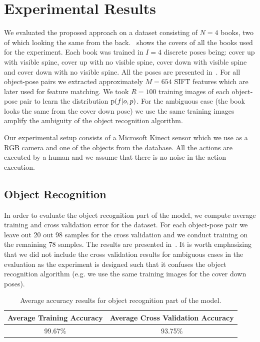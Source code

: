 \section{Experimental Results}



    We evaluated the proposed approach on a dataset consisting of $N = 4$ books, two of which looking the same from the back.~ shows the covers of all the books used for the experiment. Each book was trained in $I = 4$ discrete poses being: cover up with visible spine, cover up with no visible spine, cover down with visible spine and cover down with no visible spine. All the poses are presented in~. For all object-pose pairs we extracted approximately $M = 654$ SIFT features which are later used for feature matching. We took $R = 100$ training images of each object-pose pair to learn the distribution $\text{p}(f|o,p)$. For the ambiguous case (the book looks the same from the cover down pose) we use the same training images amplify the ambiguity of the object recognition algorithm.

    Our experimental setup consists of a Microsoft Kinect sensor which we use as a RGB camera and one of the objects from the database. All the actions are executed by a human and we assume that there is no noise in the action execution. 

    \subsection{Object Recognition}
        In order to evaluate the object recognition part of the model, we compute average training and cross validation error for the dataset. For each object-pose pair we leave out 20 out 98 samples for the cross validation and we conduct training on the remaining 78 samples. The results are presented in~. It is worth emphasizing that we did not include the cross validation results for ambiguous cases in the evaluation as the experiment is designed such that it confuses the object recognition algorithm (e.g. we use the same training images for the cover down poses).  
        
        \begin{table}[h]
                \centering
                \begin{tabular}{|c|c|}
                \hline
                Average Training Accuracy & Average Cross Validation Accuracy \\
                \hline
                99.67\% & 93.75\% \\
                \hline
                \end{tabular}
                \caption{Average accuracy results for object recognition part of the model.}
                \label{tab:accuracy}
        \end{table}

